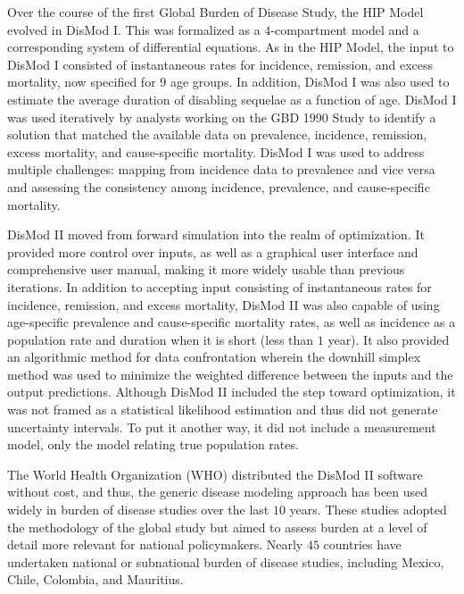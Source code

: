 Over the course of the first Global Burden of Disease Study, the HIP
Model evolved in DisMod
I.\cite{murray_global_1996}
This was formalized as a $4$-compartment model and a corresponding
system of differential equations.  As in the HIP Model, the input to
DisMod I consisted of instantaneous rates for incidence, remission,
and excess mortality, now specified for $9$ age groups.  In addition,
DisMod I was also used to
estimate the average duration of disabling sequelae as a function of
age.  DisMod I was used iteratively by analysts working on the GBD 1990
Study to identify a solution that matched the available data on
prevalence, incidence, remission, excess mortality, and cause-specific
mortality.  DisMod I was used to address multiple challenges: mapping
from incidence data to prevalence and vice versa and assessing the
consistency among incidence, prevalence, and cause-specific mortality.

DisMod II moved from forward simulation into the realm of
optimization.  It provided more control over inputs, as well as a
graphical user interface and comprehensive user manual, making it more
widely usable than previous iterations.\cite{Barendregt_Generic_2003}
In addition to accepting input consisting of instantaneous rates for incidence,
remission, and excess mortality, DisMod II was also capable of using
age-specific prevalence and cause-specific mortality rates, as well as
incidence as a population rate and duration when it is short (less
than $1$ year).  It also provided an algorithmic method for data
confrontation wherein the downhill simplex method was used to
minimize the weighted difference between the inputs and the output
predictions.  Although DisMod II included the step toward
optimization, it was not framed as a statistical likelihood estimation
and thus did not generate uncertainty intervals.  To put it another
way, it did not include a measurement model, only the model relating
true population rates.

The World Health Organization (WHO) distributed the DisMod II software
without cost, and thus, the generic disease modeling approach
has been used widely in burden of disease studies over the last $10$
years. These studies adopted the methodology of the global study but
aimed to assess burden at a level of detail more relevant for national
policymakers. Nearly $45$ countries have undertaken national or
subnational burden of disease studies, including Mexico,
Chile, Colombia, and
Mauritius.\cite{Lozano_Burden_1995,republica_de_colombia_ministerio_de_salud_carga_1994,concha_barrientos_carga_1996,Vos_Mauritius_1996}

